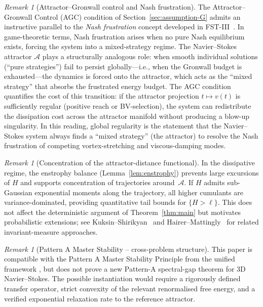 \documentclass[12pt,a4paper]{article}
\theoremstyle{definition}
\theoremstyle{plain}
\theoremstyle{remark}
\newtheorem{remark}[definition]{Remark}
\begin{document}
\begin{remark}[Attractor--Gronwall control and Nash frustration]
\label{rem:agc-nash-frustration}
The Attractor--Gronwall Control (AGC) condition of
Section~\ref{sec:assumption-G} admits an instructive parallel
to the \emph{Nash frustration} concept developed in
FST-III~\cite{FST-Unified2026}.  In game-theoretic terms,
Nash frustration arises when no pure Nash equilibrium exists,
forcing the system into a mixed-strategy regime.
The Navier--Stokes attractor $\mathcal{A}$ plays a structurally
analogous role: when smooth individual solutions (``pure strategies'')
fail to persist globally---i.e., when the Gronwall budget is
exhausted---the dynamics is forced onto the attractor, which acts as
the ``mixed strategy'' that absorbs the frustrated energy budget.
The AGC condition quantifies the cost of this transition: if the
attractor projection $t \mapsto v(t)$ is sufficiently regular
(positive reach or BV-selection), the system can redistribute
the dissipation cost across the attractor manifold without
producing a blow-up singularity.  In this reading, global regularity
is the statement that the Navier--Stokes system always finds a
``mixed strategy'' (the attractor) to resolve the Nash frustration
of competing vortex-stretching and viscous-damping modes.
\end{remark}

\begin{remark}[Concentration of the attractor-distance functional]
\label{rem:cumulants}
In the dissipative regime, the enstrophy balance
(Lemma~\ref{lem:enstrophy}) prevents large excursions of $H$ and
supports concentration of trajectories around~$\mathcal{A}$.
If $H$ admits sub-Gaussian exponential moments along the trajectory,
all higher cumulants are variance-dominated, providing quantitative
tail bounds for $\{H > \ell\}$.  This does not affect the deterministic
argument of Theorem~\ref{thm:main} but motivates probabilistic
extensions; see
Kuksin--Shirikyan~\cite{KuksinShirikyan2012} and
Hairer--Mattingly~\cite{HairerMattingly2006} for related invariant-measure approaches.
\end{remark}

\begin{remark}[Pattern A Master Stability -- cross-problem structure]
This paper is compatible with the Pattern A Master Stability Principle from the unified framework \cite{FST-Unified2026}, but does not prove a new Pattern-A spectral-gap theorem for 3D Navier--Stokes. The possible instantiation would require a rigorously defined transfer operator, strict convexity of the relevant renormalised free energy, and a verified exponential relaxation rate to the reference attractor.
\end{remark}
\end{document}
